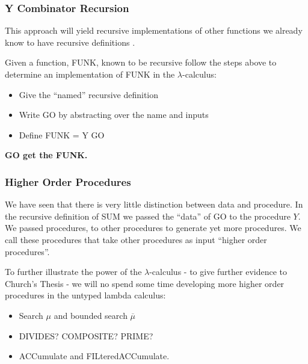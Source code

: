 \documentclass{beamer}
\begin{document}
\begin{frame}
	\frametitle{Y Combinator Recursion}

	This approach will yield recursive implementations of other functions we already know to have recursive definitions \cite{pierce}.
	
	Given a function, FUNK, known to be recursive follow the steps above to determine an implementation of FUNK in the $\lambda$-calculus:

	\begin{itemize}
		\item Give the ``named'' recursive definition
		\item Write GO by abstracting over the name and inputs
		\item Define FUNK = Y GO
	\end{itemize}

	\vspace{0.2cm}

	{\bf GO get the FUNK.}


\end{frame}

\begin{frame}
	\frametitle{Higher Order Procedures}

	We have seen that there is very little distinction between data and procedure. In the recursive definition of SUM we passed the ``data'' of GO to the procedure $Y$. We passed procedures, to other procedures to generate yet more procedures. We call these procedures that take other procedures as input ``higher order procedures''.

	To further illustrate the power of the $\lambda$-calculus - to give further evidence to Church's Thesis - we will no spend some time developing more higher order procedures in the untyped lambda calculus:

	\begin{itemize}
		\item[] Search $\mu$ and bounded search $\overline{\mu}$
		\item[] DIVIDES? COMPOSITE? PRIME?
		\item[] ACCumulate and FILteredACCumulate.
	\end{itemize}

\end{frame}
\end{document}
